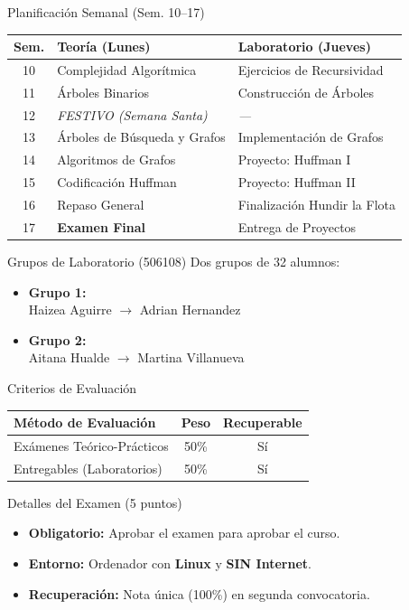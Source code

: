 \documentclass[11pt]{beamer}
\begin{document}
\begin{frame}{Planificación Semanal (Sem. 10--17)}
\centering
\tiny
\begin{tabular}{cll}
\toprule
\textbf{Sem.} & \textbf{Teoría (Lunes)} & \textbf{Laboratorio (Jueves)} \\
\midrule
10 & Complejidad Algorítmica & Ejercicios de Recursividad \\
11 & Árboles Binarios & Construcción de Árboles \\
12 & \textit{FESTIVO (Semana Santa)} & \textit{---} \\
13 & Árboles de Búsqueda y Grafos & Implementación de Grafos \\
14 & Algoritmos de Grafos & Proyecto: Huffman I \\
15 & Codificación Huffman & Proyecto: Huffman II \\
16 & Repaso General & Finalización Hundir la Flota \\
17 & \textbf{Examen Final} & Entrega de Proyectos \\
\bottomrule
\end{tabular}
\end{frame}

\begin{frame}{Grupos de Laboratorio (506108)}
Dos grupos de 32 alumnos:
\vspace{0.3cm}
\begin{itemize}
\item \textbf{Grupo 1:} \\
Haizea Aguirre $\rightarrow$ Adrian Hernandez
\item \textbf{Grupo 2:} \\
Aitana Hualde $\rightarrow$ Martina Villanueva
\end{itemize}
\end{frame}

\begin{frame}{Criterios de Evaluación}
\centering
\renewcommand{\arraystretch}{1.3}
\begin{tabular}{lcc}
\toprule
\textbf{Método de Evaluación} & \textbf{Peso} & \textbf{Recuperable} \\
\midrule
Exámenes Teórico-Prácticos & 50\% & Sí \\
Entregables (Laboratorios) & 50\% & Sí \\
\bottomrule
\end{tabular}
\end{frame}

\begin{frame}{Detalles del Examen (5 puntos)}
\begin{itemize}
\item \textbf{Obligatorio:} Aprobar el examen para aprobar el curso.
\item \textbf{Entorno:} Ordenador con \textbf{Linux} y \textbf{SIN Internet}.
\item \textbf{Recuperación:} Nota única (100\%) en segunda convocatoria.
\end{itemize}
\end{frame}
\end{document}
